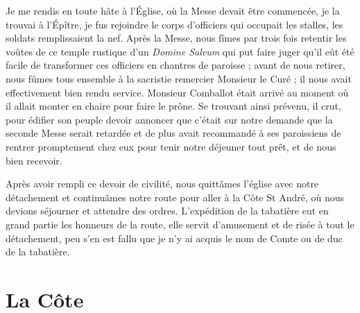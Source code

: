 \documentclass[11pt,a4paper]{report}
\begin{document}
Je me rendis en toute hâte à l'Église, où la Messe devait être commencée, je la trouvai à l'Épître, je fus rejoindre le corps d'officiers qui occupait les stalles, les soldats remplissaient la nef. Après la Messe, nous fîmes par trois fois retentir les voûtes de ce temple rustique d'un \textit{Domine Salvum} qui put faire juger qu'il eût été facile de transformer ces officiers en chantres de paroisse ; avant de nous retirer, nous fûmes tous ensemble à la sacristie remercier Monsieur le Curé ; il nous avait effectivement bien rendu service. Monsieur Comballot était arrivé au moment où il allait monter en chaire pour faire le prône. Se trouvant ainsi prévenu, il crut, pour édifier son peuple devoir annoncer que c'était sur notre demande que la seconde Messe serait retardée et de plus avait recommandé à ses paroissiens de rentrer promptement chez eux pour tenir notre déjeuner tout prêt, et de nous bien recevoir.

Après avoir rempli ce devoir de civilité, nous quittâmes l'église avec notre détachement et continuâmes notre route pour aller à la Côte St André, où nous devions séjourner et attendre des ordres. L'expédition de la tabatière eut en grand partie les honneurs de la route, elle servit d'amusement et de risée à tout le détachement, peu s'en est fallu que je n'y ai acquis le nom de Comte ou de duc de la tabatière.

\section*{La Côte}
\end{document}
